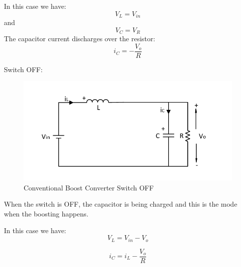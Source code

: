 In this case we have:
\begin{equation}
	V_L = V_{in}
	\label{eq:pumpHeadModel}
\end{equation}
and
\begin{equation}
	V_C = V_R
	\label{eq:pumpHeadMode2}
\end{equation}
The capacitor current discharges over the resistor:
\begin{equation}
	i_C = -\frac{V_o}{R}
	\label{eq:pumpHeadMode3}
\end{equation}


Switch OFF:

\begin{figure}[H]
   \centering
   \includegraphics[width=\textwidth]{figures/aConventionalBoost/ConventionalBoostConverterOFF.pdf}
    \caption{Conventional Boost Converter Switch OFF}
	\label{fig:ConventionalBoostOFF}
\end{figure}

When the switch is OFF,
the capacitor is being charged and this is the mode when the boosting happens.

In this case we have:
\begin{equation}
	V_L = V_{in} - V_o
	\label{eq:pumpHeadModel}
\end{equation}

\begin{equation}
	i_C = i_L -\frac{V_o}{R}
	\label{eq:pumpHeadModel}
\end{equation}

